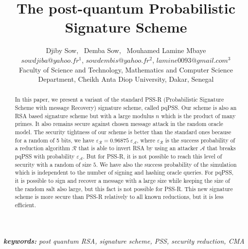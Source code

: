 \documentclass[a4paper,11pt]{article}
\author{Djiby Sow, \ Demba Sow, \ Mouhamed Lamine Mbaye\\
\small{$sowdjiba@yahoo.fr^1$,  $sowdembis@yahoo.fr^2$,  $lamine0093@gmail.com^3$}\\
Faculty of Science and Technology, Mathematics and Computer Science Department, Cheikh Anta Diop University, Dakar, Senegal}
\begin{document}
\title{The post-quantum Probabilistic Signature Scheme}
\maketitle
\begin{abstract}
In this paper, we present a variant of the standard PSS-R (Probabilistic Signature Scheme with message Recovery) signature scheme, called pqPSS. Our scheme is also an RSA based signature scheme but with a large modulus $n$ which is the product of many primes. It also remains secure against chosen message attack in the random oracle model. The security tightness of our scheme is better than the standard ones because for a random of 5 bits, we have $\varepsilon_{\mathcal{R}}=0.96875 \ \varepsilon_{\mathcal{A}}$, where $\varepsilon_{\mathcal{R}}$  is the success probability of a reduction algorithm $\mathcal{R}$ that is able to invert RSA by using an attacker $\mathcal{A}$ that breaks pqPSS with probability $\varepsilon_{\mathcal{A}}$. But for PSS-R, it is not possible to reach this level of security with a random of size $5$. We have also the success probability of the simulation which is independent to the number of signing and hashing oracle queries. For pqPSS, it is possible to sign and recover a message with a large size while keeping the size of the random salt also large, but this fact is not possible for PSS-R. This new signature scheme is more secure than PSS-R relatively to all known reductions, but it is less efficient.
\end{abstract}
{\it \textbf{keywords:} post quantum RSA, signature scheme, PSS, security reduction, CMA}
\end{document}
